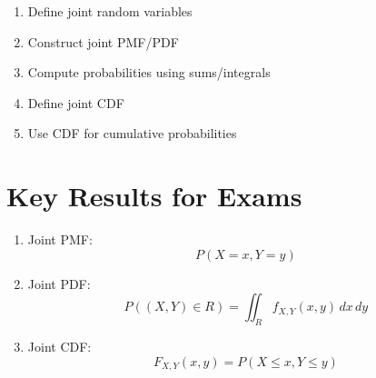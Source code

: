 \documentclass[11pt]{article}
\begin{document}
\begin{enumerate}
    \item Define joint random variables
    \item Construct joint PMF/PDF
    \item Compute probabilities using sums/integrals
    \item Define joint CDF
    \item Use CDF for cumulative probabilities
\end{enumerate}

\vspace{0.5cm}


\section{Key Results for Exams}

\begin{enumerate}
    \item Joint PMF:
    \[
    P(X=x, Y=y)
    \]
    
    \item Joint PDF:
    \[
    P((X,Y)\in R) = \iint_R f_{X,Y}(x,y)\,dx\,dy
    \]
    
    \item Joint CDF:
    \[
    F_{X,Y}(x,y) = P(X \le x, Y \le y)
    \]
\end{enumerate}
\end{document}
